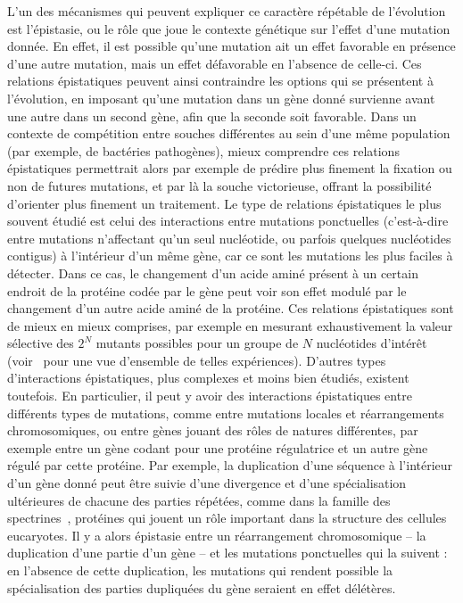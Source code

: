 L'un des mécanismes qui peuvent expliquer ce caractère répétable de l'évolution est l'épistasie, ou le rôle que joue le contexte génétique sur l'effet d'une mutation donnée.
En effet, il est possible qu'une mutation ait un effet favorable en présence d'une autre mutation, mais un effet défavorable en l'absence de celle-ci.
Ces relations épistatiques peuvent ainsi contraindre les options qui se présentent à l'évolution, en imposant qu'une mutation dans un gène donné survienne avant une autre dans un second gène, afin que la seconde soit favorable.
Dans un contexte de compétition entre souches différentes au sein d'une même population (par exemple, de bactéries pathogènes), mieux comprendre ces relations épistatiques permettrait alors par exemple de prédire plus finement la fixation ou non de futures mutations, et par là la souche victorieuse, offrant la possibilité d'orienter plus finement un traitement.
Le type de relations épistatiques le plus souvent étudié est celui des interactions entre mutations ponctuelles (c'est-à-dire entre mutations n'affectant qu'un seul nucléotide, ou parfois quelques nucléotides contigus) à l'intérieur d'un même gène, car ce sont les mutations les plus faciles à détecter.
Dans ce cas, le changement d'un acide aminé présent à un certain endroit de la protéine codée par le gène peut voir son effet modulé par le changement d'un autre acide aminé de la protéine.
Ces relations épistatiques sont de mieux en mieux comprises, par exemple en mesurant exhaustivement la valeur sélective des $2^N$ mutants possibles pour un groupe de $N$ nucléotides d'intérêt (voir~\cite{achaz2014} pour une vue d'ensemble de telles expériences).
D'autres types d'interactions épistatiques, plus complexes et moins bien étudiés, existent toutefois.
En particulier, il peut y avoir des interactions épistatiques entre différents types de mutations, comme entre mutations locales et réarrangements chromosomiques, ou entre gènes jouant des rôles de natures différentes, par exemple entre un gène codant pour une protéine régulatrice et un autre gène régulé par cette protéine.
Par exemple, la duplication d'une séquence à l'intérieur d'un gène donné peut être suivie d'une divergence et d'une spécialisation ultérieures de chacune des parties répétées, comme dans la famille des spectrines~\citep{thomas1997}, protéines qui jouent un rôle important dans la structure des cellules eucaryotes.
Il y a alors épistasie entre un réarrangement chromosomique -- la duplication d'une partie d'un gène -- et les mutations ponctuelles qui la suivent : en l'absence de cette duplication, les mutations qui rendent possible la spécialisation des parties dupliquées du gène seraient en effet délétères.

